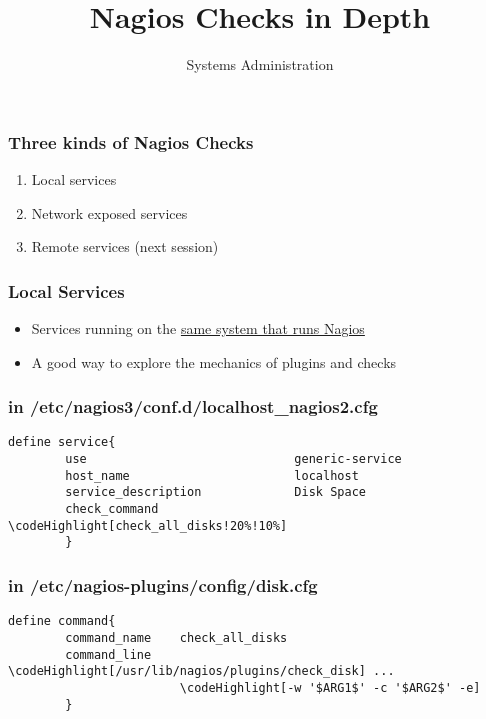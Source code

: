 \documentclass[10pt]{beamer}
\title{Nagios Checks in Depth}
\author[IN719]{Systems Administration}
\institute[Otago Polytechnic]{
  School of Information Technology \\
  Otago Polytechnic \\
  Dunedin, New Zealand \\
}
\date{}
\newcommand\codeHighlight[1]{\textcolor[rgb]{1,0,0}{\textbf{#1}}}
\begin{document}
\begin{frame}[plain]
  \titlepage
\end{frame}

\begin{frame}
  \frametitle{Three kinds of Nagios Checks}


\begin{enumerate}
  \item Local services
  \item Network exposed services
  \item Remote services (next session)
\end{enumerate}

\end{frame}

\begin{frame}
  \frametitle{Local Services}


\begin{itemize}
  \item Services running on the \underline{same system that runs Nagios}
  \item A good way to explore the mechanics of plugins and checks
\end{itemize}

\end{frame}

\begin{frame}[fragile]
  \frametitle{in /etc/nagios3/conf.d/localhost\_nagios2.cfg}


\begin{Verbatim}[commandchars=\\\[\]]
define service{
        use                             generic-service
        host_name                       localhost
        service_description             Disk Space
        check_command                   \codeHighlight[check_all_disks!20%!10%]
        }
\end{Verbatim}


\end{frame}

\begin{frame}[fragile]
  \frametitle{in /etc/nagios-plugins/config/disk.cfg}

\begin{Verbatim}[commandchars=\\\[\]]
define command{
        command_name    check_all_disks
        command_line    \codeHighlight[/usr/lib/nagios/plugins/check_disk] ...
                        \codeHighlight[-w '$ARG1$' -c '$ARG2$' -e]
        }

\end{Verbatim}
\end{frame}
\end{document}

